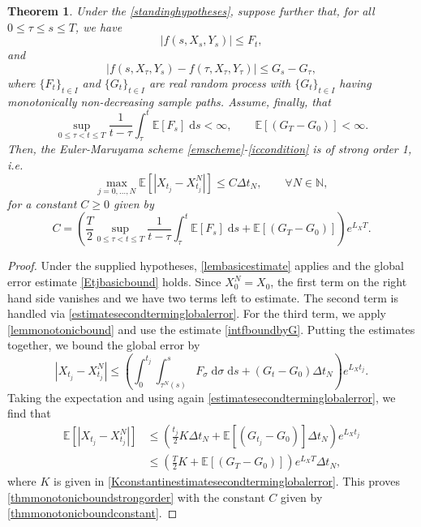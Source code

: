 \documentclass[reqno,12pt]{amsart}
\theoremstyle{plain}%
\newtheorem{thm}{Theorem}[section]
\theoremstyle{definition}
\begin{document}
\begin{thm}
  \label{thmmonotonicbound}
  Under the \cref{standinghypotheses}, suppose further that, for all $0 \leq \tau \leq s \leq T$, we have
    \begin{equation}
      |f(s, X_s, Y_s)| \leq F_t,
    \end{equation}
    and
    \begin{equation}
      \label{thmhypmonotonicbound}
        |f(s, X_\tau, Y_s) - f(\tau, X_\tau, Y_\tau)| \leq G_s - G_\tau,
    \end{equation}
    where $\{F_t\}_{t\in I}$ and $\{G_t\}_{t\in I}$ are real random process with $\{G_t\}_{t\in I}$ having monotonically non-decreasing sample paths. Assume, finally, that
    \[
        \sup_{0 \leq \tau < t \leq T}\frac{1}{t - \tau}\int_\tau^t \mathbb{E}[F_s]\;\mathrm{d}s < \infty, \qquad \mathbb{E}[(G_T - G_0)] < \infty.
    \]
    Then, the Euler-Maruyama scheme \eqref{emscheme}-\eqref{iccondition} is of strong order 1, i.e.
    \begin{equation}
      \label{thmmonotonicboundstrongorder}
        \max_{j=0, \ldots, N}\mathbb{E}\left[ \left| X_{t_j} - X_{t_j}^N \right| \right] \leq C \Delta t_N, \qquad \forall N \in \mathbb{N},
    \end{equation}
    for a constant $C \geq 0$ given by
    \begin{equation}
      \label{thmmonotonicboundconstant}
      C = \left(\frac{T}{2}\sup_{0 \leq \tau < t \leq T}\frac{1}{t - \tau}\int_\tau^t \mathbb{E}[F_s]\;\mathrm{d}s + \mathbb{E}[(G_{T} - G_0)] \right)e^{L_X T}.
    \end{equation}
\end{thm}

\begin{proof}
  Under the supplied hypotheses, \cref{lembasicestimate} applies and the global error estimate \eqref{Etjbasicbound} holds. Since $X_0^N = X_0$, the first term on the right hand side vanishes and we have two terms left to estimate. The second term is handled via \cref{estimatesecondterminglobalerror}. For the third term, we apply \cref{lemmonotonicbound} and use the estimate \eqref{intfboundbyG}. Putting the estimates together, we bound the global error by
  \[
    |X_{t_j} - X_{t_j}^N| \leq \left( \int_0^{t_j} \int_{\tau^N(s)}^s F_\sigma \;\mathrm{d}\sigma \;\mathrm{d}s + (G_t - G_0)\Delta t_N\right) e^{L_X t_j}.
  \]
  Taking the expectation and using again \cref{estimatesecondterminglobalerror}, we find that
  \begin{align*}
    \mathbb{E}\left[ |X_{t_j} - X_{t_j}^N|\right] & \leq \left( \frac{t_j}{2}K \Delta t_N + \mathbb{E}[(G_{t_j} - G_0)]\Delta t_N\right) e^{L_X t_j} \\
    & \leq \left( \frac{T}{2}K + \mathbb{E}[(G_{T} - G_0)]\right) e^{L_X T}\Delta t_N,
  \end{align*}
  where $K$ is given in \eqref{Kconstantinestimatesecondterminglobalerror}. This proves \eqref{thmmonotonicboundstrongorder} with the constant $C$ given by \eqref{thmmonotonicboundconstant}.
\end{proof}
\end{document}

